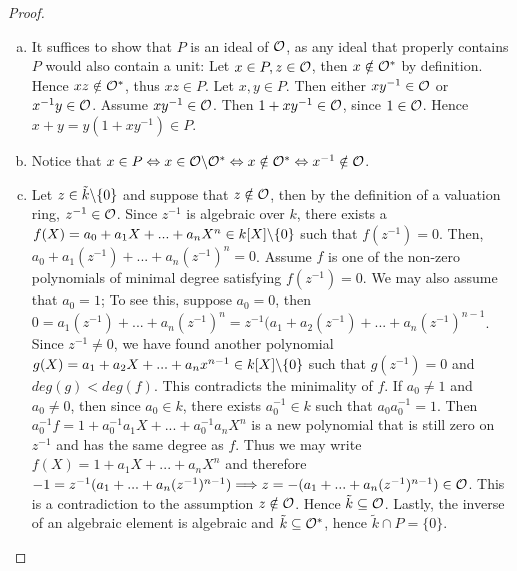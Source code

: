 \begin{proof} \label{valuationLocal}
    \begin{enumerate}[(a)]
        \item It suffices to show that $P$ is an ideal of 
        $\mathcal{O}$, as any ideal that properly contains $P$ would also 
        contain a unit: Let $x \in P, z \in \mathcal{O}$, then $x  \notin \mathcal{O}^*$ 
        by definition. Hence $xz \notin \mathcal{O}^*$, thus $xz \in P$. 
        Let $x,y \in P$. Then either $xy^{-1} \in \mathcal{O}$ or 
        $x^{-1}y \in \mathcal{O}$. Assume $xy^{-1} \in \mathcal{O} $. 
        Then $1 + xy^{-1} \in \mathcal{O}$, since $1 \in \mathcal{O}$. Hence 
        $x + y = y(1 + xy^{-1}) \in P $.
        \item Notice that $x \in P \Leftrightarrow x \in \mathcal{O} \backslash \mathcal{O}^* 
        \Leftrightarrow x \notin \mathcal{O}^* \Leftrightarrow x^{-1} \notin \mathcal{O}$.   
        \item Let $z \in \tilde{k} \backslash \lbrace 0 \rbrace $ and suppose that $z \notin \mathcal{O} $, 
        then by the definition of a valuation ring, $z^{-1}  \in \mathcal{O} $. 
        Since $z^{-1}$ is algebraic over $k$, there exists a $f(X) = a_0 + a_1X + ... + a_nX^n \in k[X] \backslash \lbrace 0 \rbrace$ 
        such that $f(z^{-1}) = 0 $. Then, $a_0 + a_1(z^{-1}) + ... + a_n(z^{-1})^n = 0 $. 
        Assume $f$ is one of the non-zero polynomials of minimal degree satisfying 
        $f(z^{-1}) = 0$. We may also assume that $a_0 = 1$; To see this, suppose $a_0 = 0 $, 
        then $0 = a_1(z^{-1}) + ... + a_n(z^{-1})^n = z^{-1}(a_1 + a_2(z^{-1}) 
        + ... + a_n(z^{-1})^{n-1}$. 
        Since $z^{-1} \neq 0$, we have found another polynomial 
        $g(X) = a_1 + a_2X + ... + a_nx^{n-1} \in k[X] \backslash \lbrace 0 \rbrace $ such that 
        $g(z^{-1}) = 0$ and $deg(g) < deg(f) $. This contradicts the minimality of 
        $f$. If $a_0 \neq 1$ and $a_0 \neq 0$, then since $a_0 \in k$, there 
        exists $a_0^{-1} \in k$ such that $a_0a_0^{-1} = 1 $. Then 
        $a_0^{-1}f= 1 + a_0^{-1}a_1X + ... + a_0^{-1}a_nX^n $ is a new 
        polynomial that is still zero on $z^{-1}$ and has the same degree 
        as $f$. Thus we may write $f(X) = 1 + a_1X + ... + a_nX^n  $ and therefore
        $-1 = z^{-1}(a_1 + ... + a_n(z^{-1})^{n-1}) \Longrightarrow z = 
        -(a_1 + ... + a_n(z^{-1})^{n-1}) \in \mathcal{O} $. 
        This is a contradiction to the assumption $z \notin \mathcal{O} $. Hence 
        $\tilde{k} \subseteq \mathcal{O} $. Lastly, the inverse of an algebraic 
        element is algebraic and $\tilde{k} \subseteq \mathcal{O}^* $, 
        hence $\tilde{k} \cap P = \lbrace 0 \rbrace $. 
    \end{enumerate}
\end{proof} 

